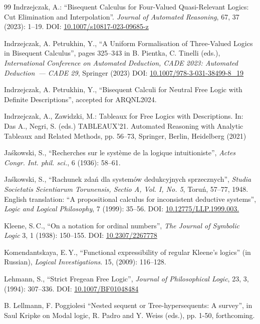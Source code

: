 \documentclass[10pt,a4paper]{article}
\theoremstyle{definition}
\newcommand{\3}{\vspace{.3in}}
\newcommand{\2}{\vspace{.2in}}
\newcommand{\1}{\vspace{.1in}}
\newcommand{\5}{\vspace{.05in}}
\newcommand\DOI[2]{DOI: \href{#1#2}{#2}}
\newcommand{\ts}{\,}
\begin{document}
\begin{thebibliography}{99}
Indrzejczak, A.: ``Bisequent Calculus for Four-Valued Quasi-Relevant Logics: Cut Elimination and Interpolation''. \textit{Journal of Automated Reasoning}, 67, 37 (2023): 1--19.
\DOI{http://dx.doi.org/}{10.1007/s10817-023-09685-z}

Indrzejczak, A. Petrukhin, Y., ``A Uniform Formalisation of Three-Valued Logics in Bisequent Calculus'', pages 325--343 in B. Pientka, C. Tinelli (eds.), \textit{International Conference on Automated Deduction, CADE 2023: Automated Deduction~--- CADE 29}, Springer (2023) 
\DOI{http://dx.doi.org/}{10.1007/978-3-031-38499-8\_19}

Indrzejczak, A. Petrukhin, Y., ``Bisequent Calculi for Neutral Free Logic with Definite Descriptions'', accepted for ARQNL2024.


{
	Indrzejczak, A., Zawidzki, M.: Tableaux for Free
	Logics with Descriptions. In: Das A., Negri, S. (eds.) TABLEAUX'21.	Automated Reasoning with Analytic Tableaux and Related Methods, pp. 56--73, Springer, Berlin, Heidelberg (2021)}


Ja\'{s}kowski, S.,  
``Recherches sur le syst\`{e}me de la logique intuitioniste'', \textit{Actes Congr. Int. phil. sci.}, 6 (1936): 58--61.

Ja\'{s}kowski, S., ``Rachunek zda\'{n} dla system\'{o}w dedukcyjnych sprzecznych'', \textit{Studia Societatis Scientiarum Torunensis, Sectio A, Vol. I, No. 5}, Toru\'{n}, 57--77, 1948. English translation: ``A propositional calculus for inconsistent deductive systems'', \textit{Logic and Logical Philosophy}, 7 (1999): 35--56.
\DOI{http://dx.doi.org/}{10.12775/LLP.1999.003.}

 Kleene, S.\ts C., ``On a notation for ordinal numbers'', \textit{The Journal of Symbolic Logic} 3, 1 (1938): 150--155.
\DOI{http://dx.doi.org/}{10.2307/2267778}

Komendantskaya, E.\ts Y., ``Functional expressibility of regular Kleene's logics'' (in Russian), \textit{Logical Investigations}. 15, (2009): 116--128. 

Lehmann, S., ``Strict Fregean Free Logic'', \textit{Journal of Philosophical Logic}, 23, 3, (1994): 307--336.
\DOI{http://dx.doi.org/}{10.1007/BF01048484}

B. Lellmann, F. Poggiolesi ``Nested sequent or Tree-hypersequents: A survey'', in Saul Kripke on Modal logic, R. Padro and Y. Weiss (eds.), pp. 1-50, forthcoming.  



\end{thebibliography}
\end{document}
